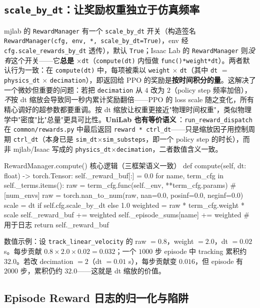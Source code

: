 \subsection{\texttt{scale\_by\_dt}：让奖励权重独立于仿真频率}
\label{sec:rlmc-rew-scalebydt}

mjlab 的 \verb|RewardManager| 有一个 \verb|scale_by_dt| 开关（构造签名 \verb|RewardManager(cfg, env, *, scale_by_dt=True)|，env 经 \verb|cfg.scale_rewards_by_dt| 透传），默认 \verb|True|；Isaac Lab 的 \verb|RewardManager| 则\emph{没有}这个开关——它\textbf{总是} $\times$\verb|dt|（\verb|compute(dt)| 内恒做 \verb|func()*weight*dt|）。两者默认行为一致：在 \verb|compute(dt)| 中，每项被乘以 \verb|weight| $\times$ \verb|dt|（其中 \verb|dt| $=$ \verb|physics_dt| $\times$ \verb|decimation|），即返回给 PPO 的奖励是\textbf{按时间积分的量}。这解决了一个微妙但重要的问题：若把 \verb|decimation| 从 $4$ 改为 $2$（policy step 频率加倍），\emph{不}按 dt 缩放会导致同一秒内累计奖励翻倍——PPO 的 loss scale 随之变化，所有精心调好的超参数都要重调。按 dt 缩放让权重更接近"物理时间权重"，类似物理学中"密度"比"总量"更具可比性。\textbf{UniLab 也有等价语义}\,\cite{unilab2026}：\verb|run_reward_dispatch| 在 \verb|common/rewards.py| 中最后返回 \verb|reward * ctrl_dt|——只是缩放因子用控制周期 \verb|ctrl_dt|（本身已是 \verb|sim_dt|$\times$\verb|sim_substeps|，即一个 policy step 的时长），而非 mjlab/Isaac 写成的 \verb|physics_dt|$\times$\verb|decimation|，二者数值含义一致。

\begin{codebox}[Python]{RewardManager.compute() 核心逻辑（三框架语义一致）}
def compute(self, dt: float) -> torch.Tensor:
    self._reward_buf[:] = 0.0
    for name, term_cfg in self._terms.items():
        raw = term_cfg.func(self._env, **term_cfg.params)        # [num_envs]
        raw = torch.nan_to_num(raw, nan=0.0, posinf=0.0, neginf=0.0)
        scale = dt if self.cfg.scale_by_dt else 1.0
        weighted = raw * term_cfg.weight * scale
        self._reward_buf += weighted
        self._episode_sums[name] += weighted                     # 用于日志
    return self._reward_buf
\end{codebox}

数值示例：设 \verb|track_linear_velocity| 的 raw $=0.8$，weight $=2.0$，dt $=0.02$ s。每步贡献 $0.8\times2.0\times0.02=0.032$；一个 $1000$ 步 episode 中 tracking 累积约 $32.0$。若改 decimation $=2$（dt $=0.01$ s），每步贡献变 $0.016$，但 episode 有 $2000$ 步，累积仍约 $32.0$——这就是 dt 缩放的价值。

\subsection{Episode Reward 日志的归一化与陷阱}
\label{sec:rlmc-rew-logging}

